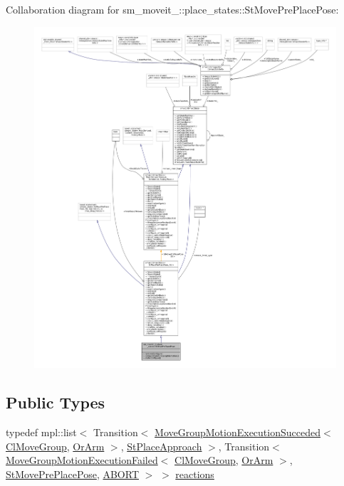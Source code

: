 Collaboration diagram for sm\+\_\+moveit\+\_\+:\+:place\+\_\+states\+:\+:St\+Move\+Pre\+Place\+Pose\+:
\nopagebreak
\begin{figure}[H]
\begin{center}
\leavevmode
\includegraphics[width=350pt]{structsm__moveit__2_1_1place__states_1_1StMovePrePlacePose__coll__graph}
\end{center}
\end{figure}
\subsection*{Public Types}
\begin{DoxyCompactItemize}
\item 
typedef mpl\+::list$<$ Transition$<$ \hyperlink{structmoveit__z__client_1_1MoveGroupMotionExecutionSucceded}{Move\+Group\+Motion\+Execution\+Succeded}$<$ \hyperlink{classmoveit__z__client_1_1ClMoveGroup}{Cl\+Move\+Group}, \hyperlink{classsm__moveit__2_1_1OrArm}{Or\+Arm} $>$, \hyperlink{structsm__moveit__2_1_1place__states_1_1StPlaceApproach}{St\+Place\+Approach} $>$, Transition$<$ \hyperlink{structmoveit__z__client_1_1MoveGroupMotionExecutionFailed}{Move\+Group\+Motion\+Execution\+Failed}$<$ \hyperlink{classmoveit__z__client_1_1ClMoveGroup}{Cl\+Move\+Group}, \hyperlink{classsm__moveit__2_1_1OrArm}{Or\+Arm} $>$, \hyperlink{structsm__moveit__2_1_1place__states_1_1StMovePrePlacePose}{St\+Move\+Pre\+Place\+Pose}, \hyperlink{classABORT}{A\+B\+O\+RT} $>$ $>$ \hyperlink{structsm__moveit__2_1_1place__states_1_1StMovePrePlacePose_a89ad0cbb7a2a3fc1bbac9b56171861ed}{reactions}
\end{DoxyCompactItemize}
